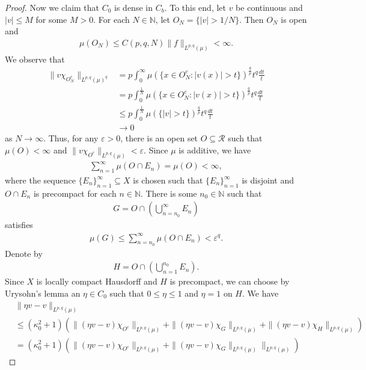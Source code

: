 \documentclass[10pt,a4paper]{amsart}
\begin{document}
\begin{proof}
Now we claim that $C_{0}$ is dense in $C_{b}$. To this end, let $v$ be continuous and $|v|\leq M$ for some $M>0$. For each $N\in\mathbb{N}$, let $O_{N}=\{|v|>1/N\}$. Then $O_{N}$ is open and 
\begin{align*}
\mu(O_{N})\leq C(p,q,N)\|f\|_{L^{p,q}(\mu)}<\infty.
\end{align*}
We observe that
\begin{align*}
\|v\chi_{O_{N}^{c}}\|_{L^{p,q}(\mu)^{q}}&=p\int_{0}^{\infty}\mu(\{x\in O_{N}^{c}:|v(x)|>t\})^{\frac{q}{p}}t^{q}\frac{dt}{t}\\
&=p\int_{0}^{\frac{1}{N}}\mu(\{x\in O_{N}^{c}:|v(x)|>t\})^{\frac{q}{p}}t^{q}\frac{dt}{t}\\
&\leq p\int_{0}^{\frac{1}{N}}\mu(\{|v|>t\})^{\frac{q}{p}}t^{q}\frac{dt}{t}\\
&\rightarrow 0
\end{align*}
as $N\rightarrow\infty$. Thus, for any $\varepsilon>0$, there is an open set $O\subseteq\mathcal{R}$ such that $\mu(O)<\infty$ and $\|v\chi_{O^{c}}\|_{L^{p,q}(\mu)}<\varepsilon$. Since $\mu$ is additive, we have 
\begin{align*}
\sum_{n=1}^{\infty}\mu(O\cap E_{n})=\mu(O)<\infty,
\end{align*}
where the sequence $\{E_{n}\}_{n=1}^{\infty}\subseteq X$ is chosen such that $\{E_{n}\}_{n=1}^{\infty}$ is disjoint and $O\cap E_{n}$ is precompact for each $n\in\mathbb{N}$. There is some $n_{0}\in\mathbb{N}$ such that
\begin{align*}
G=O\cap\left(\bigcup_{n=n_{0}}^{\infty}E_{n}\right)
\end{align*}
satisfies
\begin{align*}
\mu(G)\leq\sum_{n=n_{0}}^{\infty}\mu(O\cap E_{n})<\varepsilon^{q}.
\end{align*}
Denote by 
\begin{align*}
H=O\cap\left(\bigcup_{n=1}^{n_{0}}E_{n}\right).
\end{align*}
Since $X$ is locally compact Hausdorff and $H$ is precompact, we can choose by Urysohn's lemma an $\eta\in C_{0}$ such that $0\leq\eta\leq 1$ and $\eta=1$ on $H$. We have
\begin{align*}
&\|\eta v-v\|_{L^{p,q}(\mu)}\\
&\leq(\kappa_{0}^{2}+1)(\|(\eta v-v)\chi_{O^{c}}\|_{L^{p,q}(\mu)}+\|(\eta v-v)\chi_{G}\|_{L^{p,q}(\mu)}+\|(\eta v-v)\chi_{H}\|_{L^{p,q}(\mu)})\\
&=(\kappa_{0}^{2}+1)(\|(\eta v-v)\chi_{O^{c}}\|_{L^{p,q}(\mu)}+\|(\eta v-v)\chi_{G}\|_{L^{p,q}(\mu)}\|_{L^{p,q}(\mu)})

\end{align*}
\end{proof}
\end{document}
